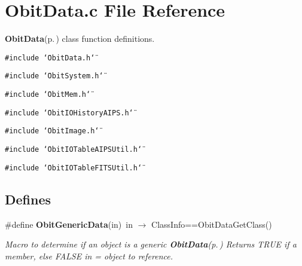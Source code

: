 \section{Obit\-Data.c File Reference}
\label{ObitData_8c}
{\bf Obit\-Data}{\rm (p.\,\pageref{structObitData})} class function definitions. 

{\tt \#include \char`\"{}Obit\-Data.h\char`\"{}}\par
{\tt \#include \char`\"{}Obit\-System.h\char`\"{}}\par
{\tt \#include \char`\"{}Obit\-Mem.h\char`\"{}}\par
{\tt \#include \char`\"{}Obit\-IOHistory\-AIPS.h\char`\"{}}\par
{\tt \#include \char`\"{}Obit\-Image.h\char`\"{}}\par
{\tt \#include \char`\"{}Obit\-IOTable\-AIPSUtil.h\char`\"{}}\par
{\tt \#include \char`\"{}Obit\-IOTable\-FITSUtil.h\char`\"{}}\par
\subsection*{Defines}
\begin{CompactItemize}
\item 
\#define {\bf Obit\-Generic\-Data}(in)\ in $\rightarrow$ Class\-Info==Obit\-Data\-Get\-Class()
\begin{CompactList}\small\item\em Macro to determine if an object is a generic {\bf Obit\-Data}{\rm (p.\,\pageref{structObitData})} Returns TRUE if a member, else FALSE in = object to reference. \item\end{CompactList}\end{CompactItemize}
